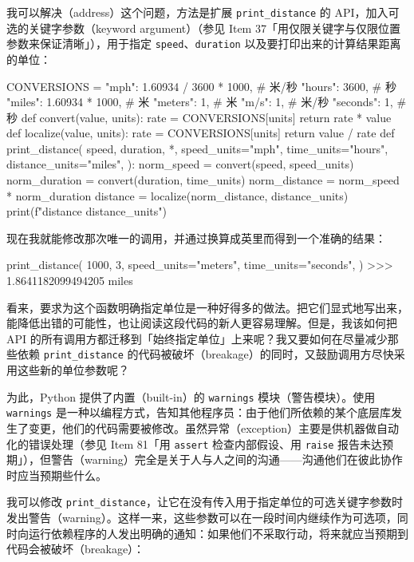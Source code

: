 我可以解决（address）这个问题，方法是扩展 \texttt{print\_distance} 的 API，加入可选的关键字参数（keyword argument）（参见 Item 37「用仅限关键字与仅限位置参数来保证清晰」），用于指定 \texttt{speed}、\texttt{duration} 以及要打印出来的计算结果距离的单位：

\begin{codebox}[python]
CONVERSIONS = {
    "mph": 1.60934 / 3600 * 1000,  # 米/秒
    "hours": 3600,                 # 秒
    "miles": 1.60934 * 1000,       # 米
    "meters": 1,                   # 米
    "m/s": 1,                      # 米/秒
    "seconds": 1,                  # 秒
}
def convert(value, units):
    rate = CONVERSIONS[units]
    return rate * value
def localize(value, units):
    rate = CONVERSIONS[units]
    return value / rate
def print_distance(
    speed,
    duration,
    *,
    speed_units="mph",
    time_units="hours",
    distance_units="miles",
):
    norm_speed = convert(speed, speed_units)
    norm_duration = convert(duration, time_units)
    norm_distance = norm_speed * norm_duration
    distance = localize(norm_distance, distance_units)
    print(f"{distance} {distance_units}")
\end{codebox}

现在我就能修改那次唯一的调用，并通过换算成英里而得到一个准确的结果：

\begin{codebox}[python]
print_distance(
    1000,
    3,
    speed_units="meters",
    time_units="seconds",
)
>>>
1.8641182099494205 miles
\end{codebox}

看来，要求为这个函数明确指定单位是一种好得多的做法。把它们显式地写出来，能降低出错的可能性，也让阅读这段代码的新人更容易理解。但是，我该如何把 API 的所有调用方都迁移到「始终指定单位」上来呢？我又要如何在尽量减少那些依赖 \texttt{print\_distance} 的代码被破坏（breakage）的同时，又鼓励调用方尽快采用这些新的单位参数呢？

为此，Python 提供了内置（built-in）的 \texttt{warnings} 模块（警告模块）。使用 \texttt{warnings} 是一种以编程方式，告知其他程序员：由于他们所依赖的某个底层库发生了变更，他们的代码需要被修改。虽然异常（exception）主要是供机器做自动化的错误处理（参见 Item 81「用 \texttt{assert} 检查内部假设、用 \texttt{raise} 报告未达预期」），但警告（warning）完全是关于人与人之间的沟通——沟通他们在彼此协作时应当预期些什么。

我可以修改 \texttt{print\_distance}，让它在没有传入用于指定单位的可选关键字参数时发出警告（warning）。这样一来，这些参数可以在一段时间内继续作为可选项，同时向运行依赖程序的人发出明确的通知：如果他们不采取行动，将来就应当预期到代码会被破坏（breakage）：

